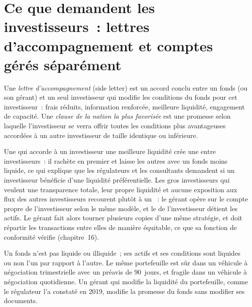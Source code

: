 \section{Ce que demandent les investisseurs~: lettres d'accompagnement et comptes gérés séparément}

\begin{definition}\label{def:fm:the-asset-manager-and-the-fund:side}
Une \emph{lettre d'accompagnement} (side letter) est un accord conclu entre un fonds (ou son gérant) et un seul investisseur qui modifie les conditions du fonds pour
cet investisseur~: frais réduits, information renforcée, meilleure liquidité, engagement de capacité. Une
\emph{clause de la nation la plus favorisée} est une promesse selon laquelle l'investisseur se verra offrir toutes les conditions plus avantageuses accordées à un autre investisseur de taille identique ou inférieure.
\end{definition}

Une  qui accorde à un investisseur une meilleure liquidité crée une  entre investisseurs~: il rachète en premier et laisse les autres avec un fonds moins
liquide, ce qui explique que les régulateurs et les consultants demandent si un investisseur bénéficie d'une liquidité préférentielle. Les gros investisseurs qui veulent une transparence totale, leur propre liquidité et aucune exposition aux flux des autres investisseurs
recourent plutôt à un ~: le gérant opère
sur le compte propre de l'investisseur selon le même modèle, et le  de l'investisseur détient les actifs. Le gérant fait alors tourner plusieurs copies d'une même stratégie, et
doit répartir les transactions entre elles de manière équitable, ce que sa fonction de conformité vérifie (chapitre~16).

\begin{remark}\label{rem:fm:the-asset-manager-and-the-fund:pair}
Un fonds n'est pas liquide ou illiquide~; ses actifs et ses conditions sont liquides ou non l'un par rapport à l'autre. Le même portefeuille est sûr dans un véhicule
à négociation trimestrielle avec un préavis de 90~jours, et fragile dans un véhicule à négociation quotidienne. Un gérant qui modifie la liquidité du portefeuille, comme le régulateur
l'a constaté en 2019, modifie la promesse du fonds sans modifier ses documents.
\end{remark}

